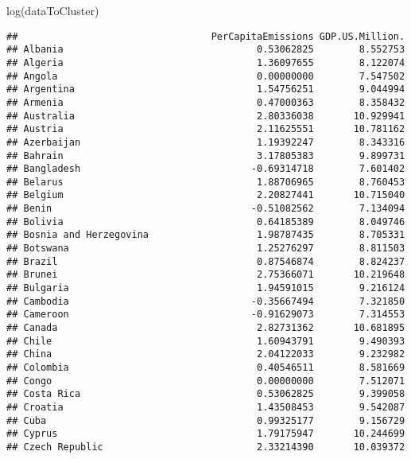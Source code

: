 \documentclass[
]{article}
\newenvironment{Shaded}{\begin{snugshade}}{\end{snugshade}}
\newcommand{\FunctionTok}[1]{\textcolor[rgb]{0.00,0.00,0.00}{#1}}
\newcommand{\NormalTok}[1]{#1}
\begin{document}
\begin{Shaded}
\begin{Highlighting}[]
\FunctionTok{log}\NormalTok{(dataToCluster)}
\end{Highlighting}
\end{Shaded}

\begin{verbatim}
##                                  PerCapitaEmissions GDP.US.Million.
## Albania                                  0.53062825        8.552753
## Algeria                                  1.36097655        8.122074
## Angola                                   0.00000000        7.547502
## Argentina                                1.54756251        9.044994
## Armenia                                  0.47000363        8.358432
## Australia                                2.80336038       10.929941
## Austria                                  2.11625551       10.781162
## Azerbaijan                               1.19392247        8.343316
## Bahrain                                  3.17805383        9.899731
## Bangladesh                              -0.69314718        7.601402
## Belarus                                  1.88706965        8.760453
## Belgium                                  2.20827441       10.715040
## Benin                                   -0.51082562        7.134094
## Bolivia                                  0.64185389        8.049746
## Bosnia and Herzegovina                   1.98787435        8.705331
## Botswana                                 1.25276297        8.811503
## Brazil                                   0.87546874        8.824237
## Brunei                                   2.75366071       10.219648
## Bulgaria                                 1.94591015        9.216124
## Cambodia                                -0.35667494        7.321850
## Cameroon                                -0.91629073        7.314553
## Canada                                   2.82731362       10.681895
## Chile                                    1.60943791        9.490393
## China                                    2.04122033        9.232982
## Colombia                                 0.40546511        8.581669
## Congo                                    0.00000000        7.512071
## Costa Rica                               0.53062825        9.399058
## Croatia                                  1.43508453        9.542087
## Cuba                                     0.99325177        9.156729
## Cyprus                                   1.79175947       10.244699
## Czech Republic                           2.33214390       10.039372

\end{verbatim}
\end{document}
